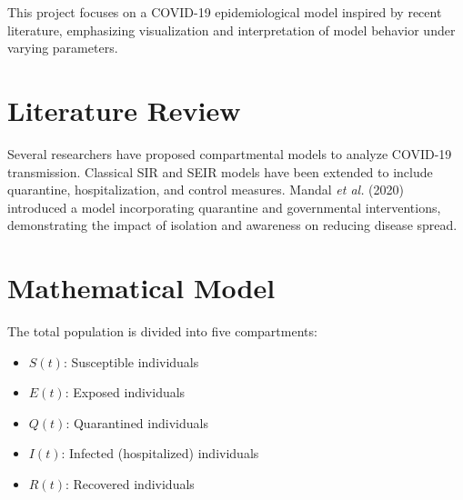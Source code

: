 \documentclass[12pt,a4paper]{article}
\begin{document}
This project focuses on a COVID-19 epidemiological model inspired by recent literature, emphasizing visualization and interpretation of model behavior under varying parameters.

\section{Literature Review}
Several researchers have proposed compartmental models to analyze COVID-19 transmission. Classical SIR and SEIR models have been extended to include quarantine, hospitalization, and control measures. Mandal \textit{et al.} (2020) introduced a model incorporating quarantine and governmental interventions, demonstrating the impact of isolation and awareness on reducing disease spread.

\section{Mathematical Model}
The total population is divided into five compartments:
\begin{itemize}
    \item $S(t)$: Susceptible individuals
    \item $E(t)$: Exposed individuals
    \item $Q(t)$: Quarantined individuals
    \item $I(t)$: Infected (hospitalized) individuals
    \item $R(t)$: Recovered individuals
\end{itemize}
\end{document}
